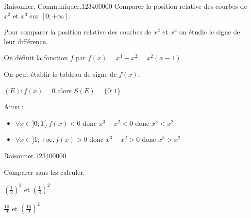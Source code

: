 \begin{pageAD}
\begin{ExoCad}{Raisonner. Communiquer.}{1234}{0}{0}{0}{0}{0}
Comparer la position relative des courbes de $x^2$ et $x^3$ sur $[0;+\infty]$.


Pour comparer la position relative des courbes de $x^2$ et $x^3$ on étudie le signe de leur différence.

On définit la fonction $f$ par $f(x)=x^3-x^2=x^2(x-1)$

On peut établir le tableau de signe de $f(x)$.

$(E):f(x)=0$ alors $S(E)=\{0;1\}$


Ainsi :

\begin{itemize}
\item $\forall x \in ]0;1[,f(x)<0$ donc $x^3-x^2<0$ donc $x^3<x^2$
\item $\forall x \in ]1;+\infty,f(x)>0$ donc $x^3-x^2>0$ donc $x^3>x^2$
\end{itemize}

\end{ExoCad} 

\begin{ExoCad}{Raisonner.}{1234}{0}{0}{0}{0}{0}

Comparer sans les calculer.

\begin{description}[leftmargin=*]
\item $(\frac{1}{3})^3$ et $(\frac{1}{3})^2$  




\item $\frac{10}{9}$ et $(\frac{10}{9})^2$



\end{description}

\end{ExoCad} 

 
\end{pageAD} %


